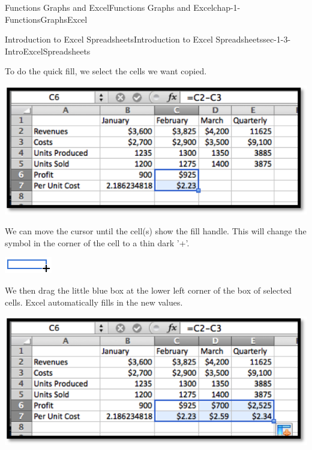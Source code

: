 \documentclass[oneside,10pt,]{book}
\numberwithin{equation}{section}
\begin{document}
\begin{chapterptx}{Functions Graphs and Excel}{}{Functions Graphs and Excel}{}{}{chap-1-FunctionsGraphsExcel}
\begin{sectionptx}{Introduction to Excel Spreadsheets}{}{Introduction to Excel Spreadsheets}{}{}{sec-1-3-IntroExcelSpreadsheets}
\par
\hypertarget{p-241}{}%
To do the quick fill, we select the cells we want copied.%
\begin{sidebyside}{1}{0.1}{0.1}{0}%
\begin{sbspanel}{0.8}%
\includegraphics[width=1\linewidth]{images/sec1-3-4.png}
\end{sbspanel}%
\end{sidebyside}%
\par
\hypertarget{p-242}{}%
We can move the cursor until the cell(s) show the fill handle. This will change the symbol in the corner of the cell to a thin dark '+'.%
\begin{sidebyside}{1}{0.4}{0.4}{0}%
\begin{sbspanel}{0.2}%
\includegraphics[width=1\linewidth]{images/sec1-3-5.png}
\end{sbspanel}%
\end{sidebyside}%
\par
\hypertarget{p-243}{}%
We then drag the little blue box at the lower left corner of the box of selected cells.  Excel automatically fills in the new values.%
\begin{sidebyside}{1}{0.1}{0.1}{0}%
\begin{sbspanel}{0.8}%
\includegraphics[width=1\linewidth]{images/sec1-3-6FebSums.png}

\end{sbspanel}
\end{sidebyside}
\end{sectionptx}
\end{chapterptx}
\end{document}
